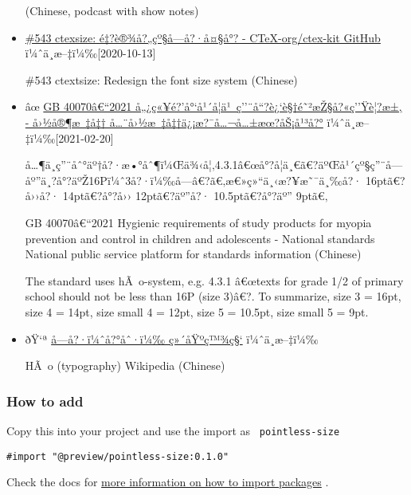 \begin{itemize}
  (Chinese, podcast with show notes)
\item
  \href{https://github.com/CTeX-org/ctex-kit/issues/543}{\#543 ctexsize:
  é‡?è®¾å?„çº§å­---å?·å¤§å°? - CTeX-org/ctex-kit \textbar{} GitHub}
  ï¼ˆä¸­æ--‡ï¼‰{[}2020-10-13{]}

  \#543 ctextsize: Redesign the font size system (Chinese)
\item
  âœ
  \href{https://std.samr.gov.cn/gb/search/gbDetailed?id=BBE32B661B7E8FC8E05397BE0A0AB906}{GB
  40070â€``2021 å„¿ç«¥é?'å°`å¹´å­¦ä¹~ç''¨å``?è¿`è§†é˜²æŽ§å?«ç''Ÿè¦?æ±‚ -
  å›½å®¶æ~‡å‡† \textbar{}
  å\ldots¨å›½æ~‡å‡†ä¿¡æ?¯å\ldots¬å\ldots±æœ?åŠ¡å¹³å?°}
  ï¼ˆä¸­æ--‡ï¼‰{[}2021-02-20{]}

  å\ldots¶ä¸­ç''¨åˆ°äº†å?·æ•°åˆ¶ï¼Œä¾‹å¦‚4.3.1â€œå°?å­¦ä¸€ã€?äºŒå¹´çº§ç''¨å­---åº''ä¸?å°?äºŽ16Pï¼ˆ3å?·ï¼‰å­---â€?ã€‚æ€»ç»``ä¸‹æ?¥æ˜¯ä¸‰å?·
  16ptã€?å››å?· 14ptã€?å°?å›› 12ptã€?äº''å?· 10.5ptã€?å°?äº'' 9ptã€‚

  GB 40070â€``2021 Hygienic requirements of study products for myopia
  prevention and control in children and adolescents - National
  standards \textbar{} National public service platform for standards
  information (Chinese)

  The standard uses hÃ~o-system, e.g. 4.3.1 â€œtexts for grade 1/2 of
  primary school should not be less than 16P (size 3)â€?. To summarize,
  size 3 = 16pt, size 4 = 14pt, size small 4 = 12pt, size 5 = 10.5pt,
  size small 5 = 9pt.
\item
  ðŸ`ª
  \href{https://zh.wikipedia.org/wiki/\%E5\%AD\%97\%E5\%8F\%B7_(\%E5\%8D\%B0\%E5\%88\%B7)}{å­---å?·ï¼ˆå?°åˆ·ï¼‰\textbar{}
  ç»´åŸºç™¾ç§`} ï¼ˆä¸­æ--‡ï¼‰

  HÃ~o (typography) \textbar{} Wikipedia (Chinese)
\end{itemize}

\subsubsection{How to add}\label{how-to-add}

Copy this into your project and use the import as
\texttt{\ pointless-size\ }

\begin{verbatim}
#import "@preview/pointless-size:0.1.0"
\end{verbatim}



Check the docs for
\href{https://typst.app/docs/reference/scripting/\#packages}{more
information on how to import packages} .

